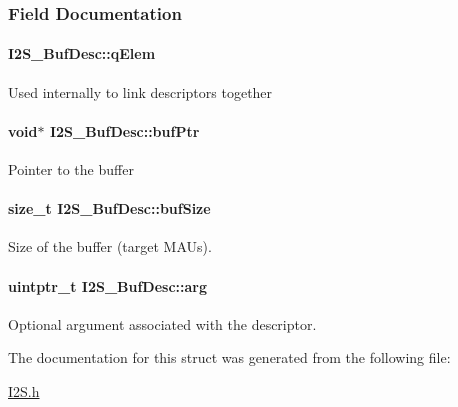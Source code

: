 \subsubsection{Field Documentation}
\paragraph[{q\+Elem}]{ I2\+S\+\_\+\+Buf\+Desc\+::q\+Elem}\label{struct_i2_s___buf_desc_ad521da1d3692dbbcefbff1fe13e1916d}
Used internally to link descriptors together 
\paragraph[{buf\+Ptr}]{\setlength{\rightskip}{0pt plus 5cm}void$\ast$ I2\+S\+\_\+\+Buf\+Desc\+::buf\+Ptr}\label{struct_i2_s___buf_desc_a63edcc97dba1524e4a63a055a6face33}
Pointer to the buffer 
\paragraph[{buf\+Size}]{\setlength{\rightskip}{0pt plus 5cm}size\+\_\+t I2\+S\+\_\+\+Buf\+Desc\+::buf\+Size}\label{struct_i2_s___buf_desc_a2d650ead8a0d337cb4d292e52e1a02c5}
Size of the buffer (target M\+A\+Us). 
\paragraph[{arg}]{\setlength{\rightskip}{0pt plus 5cm}uintptr\+\_\+t I2\+S\+\_\+\+Buf\+Desc\+::arg}\label{struct_i2_s___buf_desc_a572be4bbbf39c6d7a0745829684676e1}
Optional argument associated with the descriptor. 

The documentation for this struct was generated from the following file\+:\begin{DoxyCompactItemize}
\item 
\hyperlink{_i2_s_8h}{I2\+S.\+h}\end{DoxyCompactItemize}
